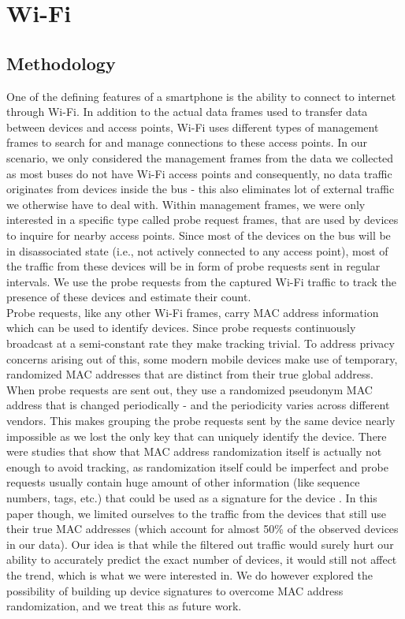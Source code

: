 \section{Wi-Fi}
\label{sec:wifi}

\subsection{Methodology}
One of the defining features of a smartphone is the ability to connect to internet through Wi-Fi. In addition to the actual data frames used to transfer data between devices and access points, Wi-Fi uses different types of management frames to search for and manage connections to these access points. In our scenario, we only considered the management frames from the data we collected as most buses do not have Wi-Fi access points and consequently, no data traffic originates from devices inside the bus - this also eliminates lot of external traffic we otherwise have to deal with. Within management frames, we were only interested in a specific type called probe request frames, that are used by devices to inquire for nearby access points. Since most of the devices on the bus will be in disassociated state (i.e., not actively connected to any access point), most of the traffic from these devices will be in form of probe requests sent in regular intervals. We use the probe requests from the captured Wi-Fi traffic to track the presence of these devices and estimate their count.  \\

Probe requests, like any other Wi-Fi frames, carry MAC address information which can be used to identify devices. Since probe
requests continuously broadcast at a semi-constant rate they make tracking trivial. To address privacy concerns arising out of this, some modern mobile devices make use of temporary, randomized MAC addresses that are distinct from their true global address. When probe requests are sent out, they use a randomized pseudonym MAC address that is changed periodically - and the periodicity varies across different vendors. This makes grouping the probe requests sent by the same device nearly impossible as we lost the only key that can uniquely identify the device. There were studies that show that MAC address randomization itself is actually not enough to avoid tracking, as randomization itself could be imperfect and probe requests usually contain huge amount of other information (like sequence numbers, tags, etc.) that could be used as a signature for the device \cite{MacRandomization01, MacRandomization02}. In this paper though, we limited ourselves to the traffic from the devices that still use their true MAC addresses (which account for almost 50\% of the observed devices in our data). Our idea is that while the filtered out traffic would surely hurt our ability to accurately predict the exact number of devices, it would still not affect the trend, which is what we were interested in. We do however explored the possibility of building up device signatures to overcome MAC address randomization, and we treat this as future work. \\

